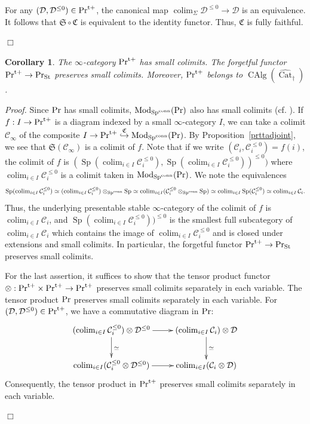 \documentclass[leqno,12pt]{amsart}
\theoremstyle{plain}
\newtheorem{Corollary}[Theorem]{Corollary}
\theoremstyle{definition}
\newcommand{\DDD}{\mathcal{D}}
\newcommand{\CCC}{\mathcal{C}}
\newcommand{\PR}{\textup{Pr}}
\newcommand{\PRTT}{\textup{Pr}^{\textup{t}+}}
\newcommand{\SP}{\operatorname{Sp}}
\newcommand{\SPC}{\operatorname{Sp}^{\textup{conn}}}
\newcommand{\Mod}{\operatorname{Mod}}
\newcommand{\colim}{\operatorname{colim}}
\newcommand{\CAlg}{\operatorname{CAlg}}
\newcommand{\vCat}{\widehat{\operatorname{Cat}}_\dagger}
\newcommand{\PRST}{\PR_{\textup{St}}}
\newcommand{\Proof}{{\sl Proof.}\quad}
\newcommand{\QED}{{\unskip\nobreak\hfil\penalty50\quad\null\nobreak\hfil
{$\Box$}\parfillskip0pt\finalhyphendemerits0\par\medskip}}
\begin{document}
For any $(\DDD,\DDD^{\le0})\in \PRTT$, the canonical map $\colim_{\Sigma}\DDD^{\le0}\to \DDD$ is an equivalence.
It follows that $\mathfrak{S}\circ \mathfrak{C}$ is equivalent to the identity functor. Thus, $\mathfrak{C}$ is fully faithful.
\QED



\begin{Corollary}
\label{tstablecolimits}
The $\infty$-category $\PRTT$ has small colimits. The forgetful functor $\PRTT\to \PRST$ preserves small colimits.
Moreover, $\PRTT$ belongs to $\CAlg(\vCat)$.
\end{Corollary}

\Proof
Since $\PR$ has small colimits, $\Mod_{\SPC}(\PR)$ also has small colimits (cf. \cite[4.2.3.5]{HA}).
If $f:I\to \PRTT$ is a diagram indexed by a small $\infty$-category $I$,
we can take a colimit $\CCC_{\infty}$ of the composite $I\to \PRTT\stackrel{\mathfrak{C}}{\hookrightarrow} \Mod_{\SPC}(\PR)$.
By Proposition~\ref{prttadjoint}, we see that  $\mathfrak{S}(\CCC_{\infty})$ is a colimit of $f$.
Note that if we write $(\CCC_i,\CCC_i^{\le0})=f(i)$, the colimit of $f$ is $(\SP(\colim_{i\in I}\CCC_i^{\le0}), \SP(\colim_{i\in I}\CCC_i^{\le0}))^{\le0})$
where $\colim_{i\in I}\CCC_i^{\le0}$ is a colimit taken in $\Mod_{\SPC}(\PR)$. We note the equivalences
\[
\SP(\colim_{i\in I}\CCC_i^{\le0})\simeq (\colim_{i\in I}\CCC_i^{\le0})\otimes_{\SPC}\SP\simeq \colim_{i\in I}(\CCC_i^{\le0}\otimes_{\SPC}\SP)\simeq \colim_{i\in I}\SP(\CCC_i^{\le0})\simeq \colim_{i\in I}\CCC_i.
\]
Thus, the underlying presentable stable $\infty$-category of the colimit of $f$ is $\colim_{i\in I}\CCC_i$,
and $\SP(\colim_{i\in I}\CCC_i^{\le0}))^{\le0}$ is the smallest full subcategory of $\colim_{i\in I}\CCC_i$ which contains the image of $\colim_{i\in I}\CCC_i^{\le0}$
and is closed under extensions and small colimits.
In particular, the forgetful functor $\PRTT\to \PRST$ preserves small colimits.


For the last assertion, it suffices to show that
the tensor product functor $\otimes:\PRTT\times \PRTT\to \PRTT$ preserves small colimits 
separately in each variable.
The tensor product $\PR$ preserves small colimits separately in each variable.
For $(\DDD,\DDD^{\le0})\in \PRTT$,
we have a commutative diagram in $\PR$:
\[
\xymatrix{
(\colim_{i\in I} \CCC_i^{\le0})\otimes \DDD^{\le0} \ar[r] \ar[d]^{\simeq} &  (\colim_{i\in I} \CCC_i)\otimes \DDD \ar[d]^{\simeq} \\ 
\colim_{i\in I} (\CCC_i^{\le0}\otimes \DDD^{\le0}) \ar[r]  &  \colim_{i\in I} (\CCC_i\otimes \DDD) 
}
\]
Consequently, the tensor product in $\PRTT$ preserves small colimits 
separately in each variable.
\QED
\end{document}
